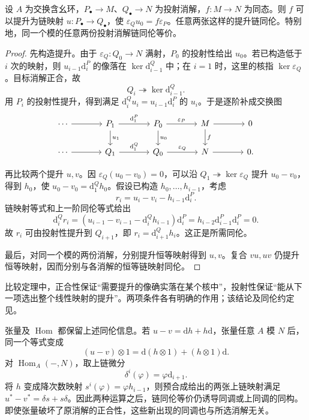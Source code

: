 \begin{theorem}[消解比较定理]\label{g5:thm:resolution-comparison}
	设 \(A\) 为交换含幺环，\(P_\bullet\to M\)、\(Q_\bullet\to N\) 为投射消解，\(f:M\to N\) 为同态。则 \(f\) 可以提升为链映射 \(u:P_\bullet\to Q_\bullet\)，使
	\(\varepsilon_Q u_0=f\varepsilon_P\)。任意两张这样的提升链同伦。特别地，同一个模的任意两份投射消解链同伦等价。
\end{theorem}
\begin{proof}
	先构造提升。由于 \(\varepsilon_Q:Q_0\to N\) 满射，\(P_0\) 的投射性给出 \(u_0\)。若已构造低于 \(i\) 次的映射，则 \(u_{i-1}\mathrm{d}_i^P\) 的像落在 \(\ker \mathrm{d}_{i-1}^Q\) 中；在 \(i=1\) 时，这里的核指 \(\ker\varepsilon_Q\)。目标消解正合，故
	\[
		Q_i\twoheadrightarrow\ker \mathrm{d}_{i-1}^Q.
	\]
	用 \(P_i\) 的投射性提升，得到满足 \(\mathrm{d}_i^Qu_i=u_{i-1}\mathrm{d}_i^P\) 的 \(u_i\)。于是逐阶补成交换图
	\[
		\begin{tikzcd}[column sep=large]
			\cdots\arrow[r]&P_1\arrow[r,"\mathrm{d}_1^P"]\arrow[d,"u_1"]
			&P_0\arrow[r,"\varepsilon_P"]\arrow[d,"u_0"]
			&M\arrow[r]\arrow[d,"f"]&0\\
			\cdots\arrow[r]&Q_1\arrow[r,"\mathrm{d}_1^Q"]
			&Q_0\arrow[r,"\varepsilon_Q"]&N\arrow[r]&0.
		\end{tikzcd}
	\]

	再比较两个提升 \(u,v\)。因 \(\varepsilon_Q(u_0-v_0)=0\)，可以沿 \(Q_1\twoheadrightarrow\ker\varepsilon_Q\) 提升 \(u_0-v_0\)，得到 \(h_0\)，使 \(u_0-v_0=\mathrm{d}_1^Qh_0\)。假设已构造 \(h_0,\ldots,h_{i-1}\)，考虑
	\[
		r_i=u_i-v_i-h_{i-1}\mathrm{d}_i^P.
	\]
	链映射等式和上一阶同伦等式给出
	\[
		\mathrm{d}_i^Qr_i
		=(u_{i-1}-v_{i-1}-\mathrm{d}_i^Qh_{i-1})\mathrm{d}_i^P
		=h_{i-2}\mathrm{d}_{i-1}^P\mathrm{d}_i^P=0.
	\]
	故 \(r_i\) 可由投射性提升到 \(Q_{i+1}\)，即 \(r_i=\mathrm{d}_{i+1}^Qh_i\)。这正是所需同伦。

	最后，对同一个模的两份消解，分别提升恒等映射得到 \(u,v\)。复合 \(vu,uv\) 仍提升恒等映射，因而分别与各消解的恒等链映射同伦。
\end{proof}

比较定理中，正合性保证“需要提升的像确实落在某个核中”，投射性保证“能从下一项选出整个线性映射的提升”。两项条件各有明确的作用；该结论及同伦约定见\cite[附录B，第274、278页]{Matsumura1989}。

\ProseParagraphBreak

张量及 \(\operatorname{Hom}\) 都保留上述同伦信息。若 \(u-v=\mathrm{d}h+h\mathrm{d}\)，张量任意 \(A\) 模 \(N\) 后，同一个等式变成
\[
	(u-v)\otimes1=\mathrm{d}(h\otimes1)+(h\otimes1)\mathrm{d}.
\]
对 \(\operatorname{Hom}_A(-,N)\)，取上链微分
\[
	\delta^i(\varphi)=\varphi \mathrm{d}_{i+1}.
\]
将 \(h\) 变成降次数映射 \(s^i(\varphi)=\varphi h_{i-1}\)，则预合成给出的两张上链映射满足 \(u^*-v^*=\delta s+s\delta\)。因此两种运算之后，链同伦等价仍诱导同调或上同调的同构。即使张量破坏了原消解的正合性，这些新出现的同调也与所选消解无关。

